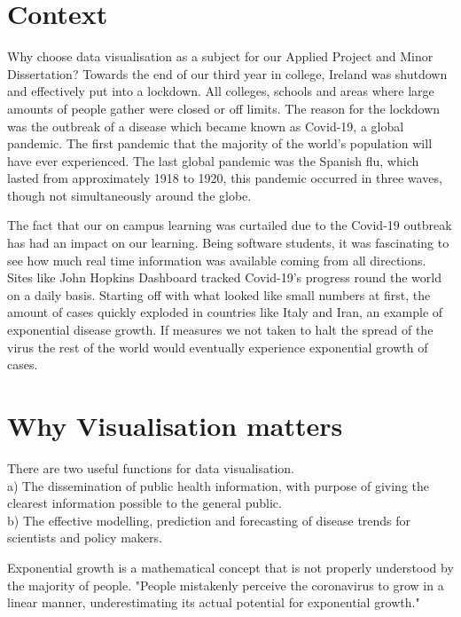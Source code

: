 \section{Context}
Why choose data visualisation as a subject for our Applied Project and Minor Dissertation? Towards the end of our third year in college, Ireland was shutdown and effectively put into a lockdown. All colleges, schools and areas where large amounts of people gather were closed or off limits. The reason for the lockdown was the outbreak of a disease which became known as Covid-19, a global pandemic. The first pandemic that the majority of the world's population will have ever experienced. The last global pandemic was the Spanish flu, which lasted from approximately 1918 to 1920, this pandemic occurred in three waves, though not simultaneously around the globe.\cite{Spanishflu}\\

\vspace{1mm}

The fact that our on campus learning was curtailed due to the Covid-19 outbreak has had an impact on our learning. Being software students, it was fascinating to see how much real time information was available coming from all directions. Sites like John Hopkins Dashboard tracked Covid-19's progress round the world on a daily basis. Starting off with what looked like small numbers at first, the amount of cases quickly exploded in countries like Italy and Iran, an example of exponential disease growth. If measures we not taken to halt the spread of the virus the rest of the world would eventually experience exponential growth of cases.\\

\vspace{1mm}
\section{Why Visualisation matters}

There are two useful functions for data visualisation.\\
a) The dissemination of public health information, with purpose of giving the clearest information possible to the general public.\\
b) The effective modelling, prediction and forecasting of disease trends for scientists and policy makers.

\vspace{5mm}

Exponential growth is a mathematical concept that is not properly understood by the majority of people.
"People mistakenly perceive the coronavirus to grow in a linear manner, underestimating its actual potential for exponential growth."\cite{lammers2020correcting}\\

